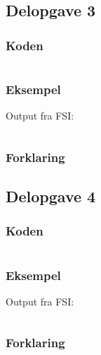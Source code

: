 \subsection{Delopgave 3}\label{ass:3-3}
\subsubsection{Koden}
\begin{lstlisting}[language=fsharp]

\end{lstlisting}

\subsubsection{Eksempel}
Output fra FSI:
\begin{lstlisting}

\end{lstlisting}

\subsubsection{Forklaring}


\subsection{Delopgave 4}\label{ass:3-4}
\subsubsection{Koden}
\begin{lstlisting}[language=fsharp]

\end{lstlisting}

\subsubsection{Eksempel}
Output fra FSI:
\begin{lstlisting}

\end{lstlisting}

\subsubsection{Forklaring}


